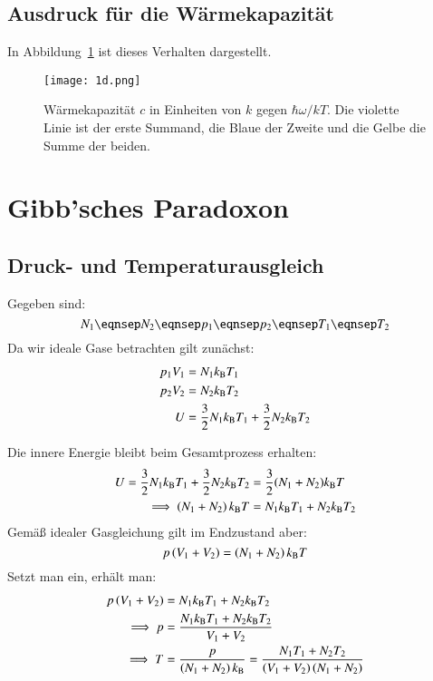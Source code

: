 \subsection{Ausdruck für die Wärmekapazität}

In Abbildung~\ref{fig:1d-c} ist dieses Verhalten dargestellt.

\begin{figure}[htbp]
    \centering
    \texttt{[image: 1d.png]}
    \caption{%
        Wärmekapazität $c$ in Einheiten von $k$ gegen $\hbar\omega / kT$. Die
        violette Linie ist der erste Summand, die Blaue der Zweite und die
        Gelbe die Summe der beiden.
    }
    \label{fig:1d-c}
\end{figure}

\section{Gibb'sches Paradoxon}

\subsection{Druck- und Temperaturausgleich}

Gegeben sind:
\[
    N_1
    \eqnsep
    N_2
    \eqnsep
    p_1
    \eqnsep
    p_2
    \eqnsep
    T_1
    \eqnsep
    T_2
\]
Da wir ideale Gase betrachten gilt zunächst:
\begin{align*}
p_1V_1 &= N_1k_\text B T_1 \\
p_2V_2 &= N_2k_\text B T_2 \\
U &= \frac{3}{2}N_1 k_\text B T_1 + \frac{3}{2} N_2 k_\text BT_2
\end{align*}

Die innere Energie bleibt beim Gesamtprozess erhalten:
\begin{align*}
U = \frac{3}{2} N_1 k_\text B T_1 + \frac{3}{2}N_2 k_\text B T_2 &= \frac{3}{2}(N_1+N_2) k_\text B T \\
\implies \del{N_1+N_2} k_\text BT &= N_1 k_\text B T_1 + N_2 k_\text B T_2 \\
\end{align*}
Gemäß idealer Gasgleichung gilt im Endzustand aber:
\[p\del{V_1+V_2}=\del{N_1+N_2}k_\text BT \]
Setzt man ein, erhält man:
\begin{align*}
p\del{V_1+V_2} &= N_1k_\text BT_1+N_2k_\text BT_2 \\
\implies p &= \frac{N_1k_\text BT_1 + N_2k_\text BT_2}{V_1+V_2} \\
\implies T &= \frac{p}{\del{N_1+N_2}k_\text B}=\frac{N_1T_1 + N_2T_2}{\del{V_1+V_2}\del{N_1+N_2}}
\end{align*}


